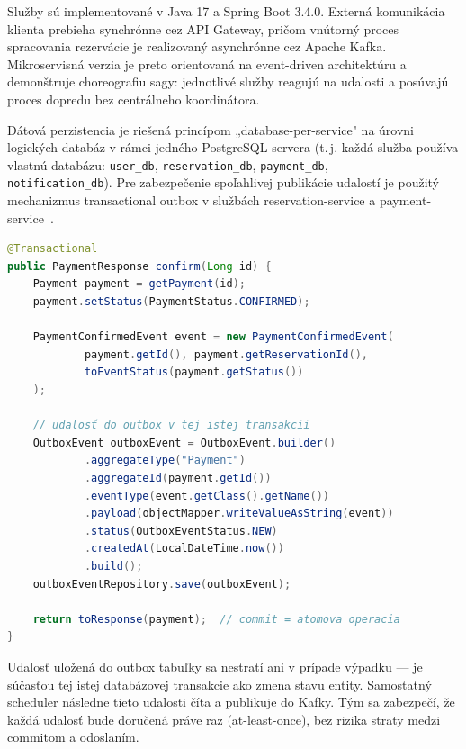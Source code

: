 Služby sú implementované v Java 17 a Spring Boot 3.4.0. Externá komunikácia klienta prebieha synchrónne cez API Gateway, pričom vnútorný proces spracovania rezervácie je realizovaný asynchrónne cez Apache Kafka. Mikroservisná verzia je preto orientovaná na event-driven architektúru a demonštruje choreografiu sagy: jednotlivé služby reagujú na udalosti a posúvajú proces dopredu bez centrálneho koordinátora.

Dátová perzistencia je riešená princípom „database-per-service" na úrovni logických databáz v rámci jedného PostgreSQL servera (t.\,j. každá služba používa vlastnú databázu: \texttt{user\_db}, \texttt{reservation\_db}, \texttt{payment\_db}, \\ \texttt{notification\_db}). Pre zabezpečenie spoľahlivej publikácie udalostí je použitý mechanizmus transactional outbox v službách reservation-service a payment-service~\cite{Richardson2018}.

\begin{lstlisting}[language=Java, breaklines=true, caption={Transactional Outbox -- atomické uloženie udalosti v rámci jednej transakcie (PaymentService.java)}]
@Transactional
public PaymentResponse confirm(Long id) {
    Payment payment = getPayment(id);
    payment.setStatus(PaymentStatus.CONFIRMED);

    PaymentConfirmedEvent event = new PaymentConfirmedEvent(
            payment.getId(), payment.getReservationId(),
            toEventStatus(payment.getStatus())
    );

    // udalosť do outbox v tej istej transakcii
    OutboxEvent outboxEvent = OutboxEvent.builder()
            .aggregateType("Payment")
            .aggregateId(payment.getId())
            .eventType(event.getClass().getName())
            .payload(objectMapper.writeValueAsString(event))
            .status(OutboxEventStatus.NEW)
            .createdAt(LocalDateTime.now())
            .build();
    outboxEventRepository.save(outboxEvent);

    return toResponse(payment);  // commit = atomova operacia
}
\end{lstlisting}

Udalosť uložená do outbox tabuľky sa nestratí ani v prípade výpadku — je súčasťou tej istej databázovej transakcie ako zmena stavu entity. Samostatný scheduler následne tieto udalosti číta a publikuje do Kafky. Tým sa zabezpečí, že každá udalosť bude doručená práve raz (at-least-once), bez rizika straty medzi commitom a odoslaním.

